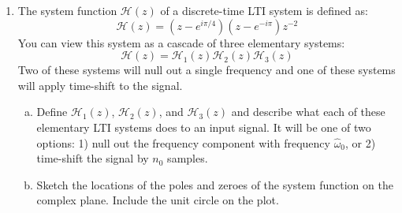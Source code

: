 \begin{enumerate}
\begin{marginfigure}
\begin{center}
\end{center}
\caption{A cascade of three elementary LTI systems defined by system functions $\mathcal{H}_1(z)$, $\mathcal{H}_2(z)$ and $\mathcal{H}_3(z)$ is equivalent to a single LTI system $\mathcal{H}(z)=\mathcal{H}_1(z)\mathcal{H}_2(z)\mathcal{H}_3(z)$.}
\label{fig:cascade_z_ex}
\end{marginfigure}

\item The system function $\mathcal{H}(z)$ of a discrete-time LTI system is defined as:
  \begin{equation}
    \mathcal{H}(z) = (z-e^{i\pi/4})(z-e^{-i\pi})z^{-2}
  \end{equation}
  You can view this system as a cascade of three elementary systems:
    \begin{equation}
      \mathcal{H}(z) = \mathcal{H}_1(z)\mathcal{H}_2(z)\mathcal{H}_3(z)
    \end{equation}
    Two of these systems will null out a single frequency and one of these systems will apply time-shift to the signal.

  \begin{enumerate}[a)]
  \item Define $\mathcal{H}_1(z)$, $\mathcal{H}_2(z)$, and $\mathcal{H}_3(z)$ and describe what each of these elementary LTI systems does to an input signal. It will be one of two options: 1) null out the frequency component with frequency $\hat{\omega}_0$, or 2) time-shift the signal by $n_0$ samples.
    
  \item Sketch the locations of the poles and zeroes of the system function on the complex plane. Include the unit circle on the plot. 
    

\end{enumerate}
\end{enumerate}
